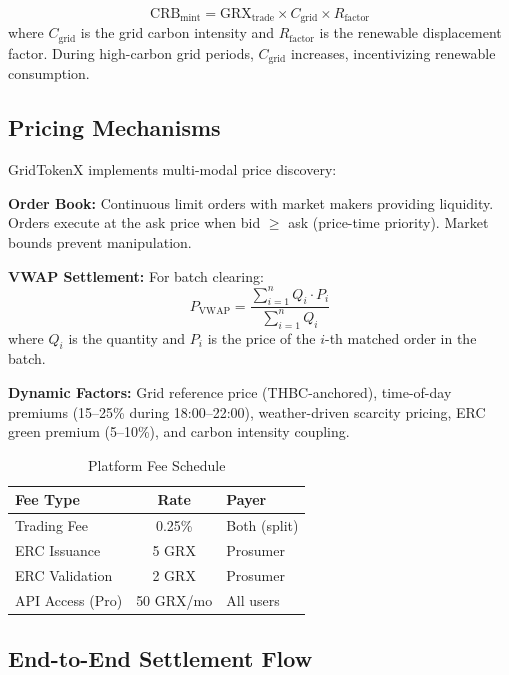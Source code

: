 \documentclass[conference]{IEEEtran}
\begin{document}
\begin{equation}
\text{CRB}_{\text{mint}} = \text{GRX}_{\text{trade}} \times C_{\text{grid}} \times R_{\text{factor}}
\end{equation}
where $C_{\text{grid}}$ is the grid carbon intensity and $R_{\text{factor}}$ is the renewable displacement factor. During high-carbon grid periods, $C_{\text{grid}}$ increases, incentivizing renewable consumption.

\subsection{Pricing Mechanisms}

GridTokenX implements multi-modal price discovery:

\textbf{Order Book:} Continuous limit orders with market makers providing liquidity. Orders execute at the ask price when bid $\geq$ ask (price-time priority). Market bounds prevent manipulation.

\textbf{VWAP Settlement:} For batch clearing:
\begin{equation}
P_{\text{VWAP}} = \frac{\displaystyle\sum_{i=1}^{n} Q_i \cdot P_i}{\displaystyle\sum_{i=1}^{n} Q_i}
\label{eq:vwap}
\end{equation}
where $Q_i$ is the quantity and $P_i$ is the price of the $i$-th matched order in the batch.

\textbf{Dynamic Factors:} Grid reference price (THBC-anchored), time-of-day premiums (15--25\% during 18:00--22:00), weather-driven scarcity pricing, ERC green premium (5--10\%), and carbon intensity coupling.

\begin{table}[htbp]
\caption{Platform Fee Schedule}
\begin{center}
\small
\begin{tabular}{@{}lcl@{}}
\toprule
\textbf{Fee Type} & \textbf{Rate} & \textbf{Payer} \\
\midrule
Trading Fee & 0.25\% & Both (split) \\
ERC Issuance & 5 GRX & Prosumer \\
ERC Validation & 2 GRX & Prosumer \\
API Access (Pro) & 50 GRX/mo & All users \\
\bottomrule
\end{tabular}
\label{tab:fees}
\end{center}
\end{table}

\subsection{End-to-End Settlement Flow}
\end{document}
